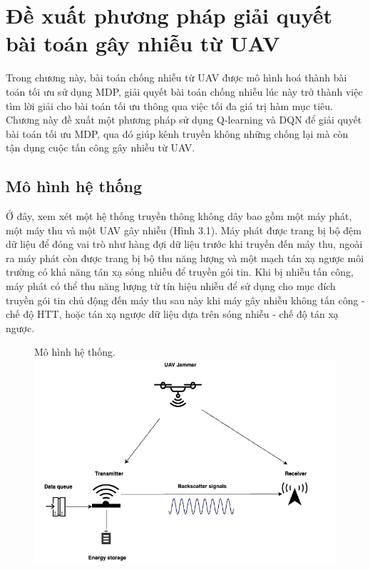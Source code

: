 \documentclass{uetgraduation}
\begin{document}
\chapter{Đề xuất phương pháp giải quyết bài toán gây nhiễu từ UAV}
Trong chương này, bài toán chống nhiễu từ UAV được mô hình hoá thành bài toán tối ưu sử dụng MDP, giải quyết bài toán chống nhiễu lúc này trở thành việc tìm lời giải cho bài toán tối ưu
thông qua việc tối đa giá trị hàm mục tiêu. Chương này đề xuất một phương pháp sử dụng Q-learning và DQN để giải quyết bài toán tối ưu MDP, qua đó giúp kênh truyền không những chống lại 
mà còn tận dụng cuộc tấn công gây nhiễu từ UAV.

\section{Mô hình hệ thống}
Ở đây, xem xét một hệ thống truyền thông không dây bao gồm một máy phát, một máy thu và một UAV gây nhiễu (Hình 3.1). Máy phát được trang bị bộ đệm dữ liệu để đóng vai trò như hàng đợi dữ 
liệu trước khi truyền đến máy thu, ngoài ra máy phát còn được trang bị bộ thu năng lượng và một mạch tán xạ ngược môi trường có khả năng tán xạ sóng nhiễu để truyền gói tin. Khi bị nhiễu
tấn công, máy phát có thể thu năng lượng từ tín hiệu nhiễu để sử dụng cho mục đích truyền gói tin chủ
động đến máy thu sau này khi máy gây nhiễu không tấn công - chế độ HTT, hoặc tán xạ ngược dữ liệu dựa trên sóng nhiễu - chế độ tán xạ ngược.

\begin{figure}{Mô hình hệ thống.}
    \centering
    \includegraphics[scale=0.5]{system_model}
    \label{fig:system_model}
\end{figure}
\end{document}
